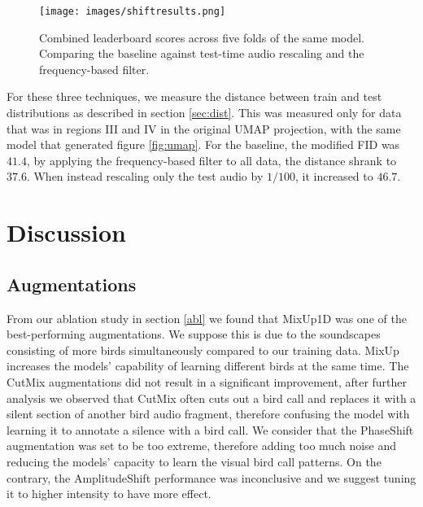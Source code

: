 \documentclass[
]{ceurart}
\begin{document}
\begin{figure}
    \centering
    \texttt{[image: images/shiftresults.png]}
    \caption{Combined leaderboard scores across five folds of the same model. Comparing the baseline against test-time audio rescaling and the frequency-based filter.}
    \label{fig:shiftresults}
\end{figure}

For these three techniques, we measure the distance between train and test distributions as described in section \ref{sec:dist}. This was measured only for data that was in regions III and IV in the original UMAP projection, with the same model that generated figure \ref{fig:umap}. For the baseline, the modified FID was $41.4$, by applying the frequency-based filter to all data, the distance shrank to $37.6$. When instead rescaling only the test audio by $1/100$, it increased to $46.7$.

\section{Discussion} \label{discussion}

\subsection*{Augmentations}
From our ablation study in section \ref{abl} we found that MixUp1D was one of the best-performing augmentations. We suppose this is due to the soundscapes consisting of more birds simultaneously compared to our training data. MixUp increases the models' capability of learning different birds at the same time. The CutMix augmentations did not result in a significant improvement, after further analysis we observed that CutMix often cuts out a bird call and replaces it with a silent section of another bird audio fragment, therefore confusing the model with learning it to annotate a silence with a bird call. We consider that the PhaseShift augmentation was set to be too extreme, therefore adding too much noise and reducing the models' capacity to learn the visual bird call patterns. On the contrary, the AmplitudeShift performance was inconclusive and we suggest tuning it to higher intensity to have more effect.
\end{document}
